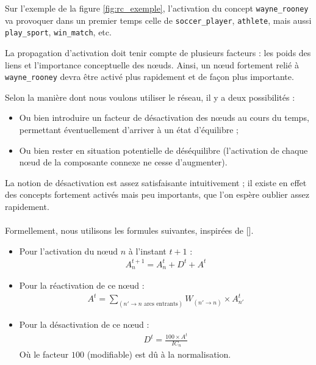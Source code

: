 \documentclass[a4paper, 12pt]{article}
\begin{document}
Sur l'exemple de la figure \ref{fig:rc_exemple}, l'activation du concept \verb|wayne_rooney| va provoquer dans un premier temps celle de \verb|soccer_player|, \verb|athlete|, mais aussi \verb|play_sport|, \verb|win_match|, etc.

La propagation d'activation doit tenir compte de plusieurs facteurs : les poids des liens et l'importance conceptuelle des n\oe uds. Ainsi, un n\oe ud fortement relié à \verb|wayne_rooney| devra être activé plus rapidement et de façon plus importante.

Selon la manière dont nous voulons utiliser le réseau, il y a deux possibilités :
\begin{itemize}
 \item Ou bien introduire un facteur de désactivation des n\oe uds au cours du temps, permettant éventuellement d'arriver à un état d'équilibre ;
 \item Ou bien rester en situation potentielle de déséquilibre (l'activation de chaque n\oe ud de la composante connexe ne cesse d'augmenter).
\end{itemize}

La notion de désactivation est assez satisfaisante intuitivement ; il existe en effet des concepts fortement activés mais peu importants, que l'on espère oublier assez rapidement. 

\paragraph{}
Formellement, nous utilisons les formules suivantes, inspirées de [].

\begin{itemize}
 \item Pour l'activation du n\oe ud $n$ à l'instant $t+1$ :
\begin{align}
 A_n^{t+1} = A_n^t + D^t + A^t
\end{align}
\item Pour la réactivation de ce n\oe ud :
\begin{align}
 A^t = \sum_{(n' \rightarrow n \text{ arcs entrants})} W_{(n'\rightarrow  n)} \times A_{n'}^t
\end{align}
\item Pour la désactivation de ce n\oe ud :
\begin{align}
 D^t = \frac{100 \times A^t}{IC_n}
\end{align}
Où le facteur $100$ (modifiable) est dû à la normalisation.
\end{itemize}
\end{document}

